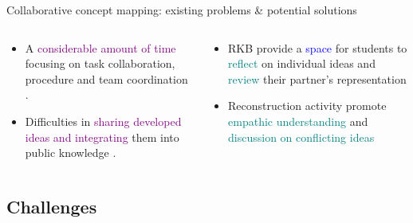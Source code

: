 \begin{frame}{Collaborative concept mapping: existing problems \& potential solutions}  
    
    \begin{columns}
        { \small \begin{column}{0.48\textwidth}
            \begin{itemize}
                \item <1->A \textcolor{purple}{considerable amount of time} focusing on task collaboration, procedure and team coordination \cite{chiu2003exploring}. 
                
                
                \item <1->Difficulties in \textcolor{purple}{sharing developed ideas and integrating} them into public knowledge \cite{Gracia-Moreno2017CollaborativeWorkspaces,vanBoxtel2000CollaborativeKnowledge}.
            \end{itemize}
        \end{column}
    
        \begin{column}{0.48\textwidth}
            \begin{itemize}
                \item <2>RKB provide a \textcolor{blue}{space} for students to \textcolor{teal}{reflect} on individual ideas and \textcolor{teal}{review} their partner's representation
                
                \item <2>Reconstruction activity promote \textcolor{teal}{empathic understanding} and \textcolor{teal}{discussion on conflicting ideas}  
            \end{itemize}
        \end{column}
        }
    \end{columns}
    
\end{frame}

\subsection{Challenges}

